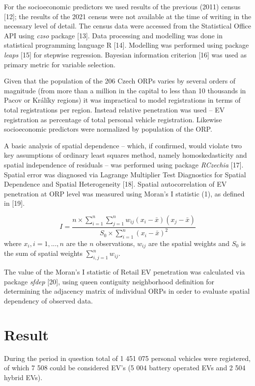 \documentclass{mmeproc}
\begin{document}
For the socioeconomic predictors we used results of the previous (2011)
census {[}12{]}; the results of the 2021 census were not available at
the time of writing in the necessary level of detail. The census data
were accessed from the Statistical Office API using \emph{czso} package
{[}13{]}. Data processing and modelling was done in statistical
programming language R {[}14{]}. Modelling was performed using package
\emph{leaps} {[}15{]} for stepwise regression. Bayesian information
criterion {[}16{]} was used as primary metric for variable selection.

Given that the population of the 206 Czech ORPs varies by several orders
of magnitude (from more than a million in the capital to less than 10
thousands in Pacov or Králíky regions) it was impractical to model
registrations in terms of total registrations per region. Instead
relative penetration was used -- EV registration as percentage of total
personal vehicle registration. Likewise socioeconomic predictors were
normalized by population of the ORP.

A basic analysis of spatial dependence -- which, if confirmed, would
violate two key assumptions of ordinary least squares method, namely
homoskedasticity and spatial independence of residuals -- was performed
using package \emph{RCzechia} {[}17{]}. Spatial error was diagnosed via
Lagrange Multiplier Test Diagnostics for Spatial Dependence and Spatial
Heterogeneity {[}18{]}. Spatial autocorrelation of EV penetration at ORP
level was measured using Moran's I statistic (1), as defined in {[}19{]}.

\[
I = \frac{n \times \sum_{i=1}^n\sum_{j=1}^n w_{ij}(x_i - \bar{x})(x_j - \bar{x})}{S_0 \times \sum_{i=1}^n (x_i - \bar{x})^2} \tag{1}
\]
where \(x_i, i = 1, ..., n\) are the \(n\) observations, \(w_{ij}\)
are the spatial weights and \(S_0\) is the sum of spatial weights
\(\sum_{i, j=1}^n w_{ij}\).

The value of the Moran's I statistic of Retail EV penetration was
calculated via package \emph{sfdep} {[}20{]}, using queen contiguity
neighborhood definition for determining the adjacency matrix of
individual ORPs in order to evaluate spatial dependency of observed
data.

\hypertarget{result}{%
\section{Result}\label{result}}

During the period in question total of 1 451 075 personal vehicles were
registered, of which 7 508 could be considered EV's (5 004 battery
operated EVs and 2 504 hybrid EVs).
\end{document}

